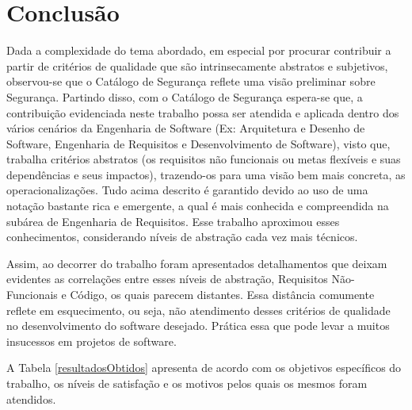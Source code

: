 \chapter{Conclusão}
\label{chap:consideracoesFinais}



Dada a complexidade do tema abordado, em especial por procurar contribuir a partir de critérios de qualidade que são intrinsecamente abstratos e subjetivos, observou-se que o Catálogo de Segurança reflete uma visão preliminar sobre Segurança. Partindo disso, com o Catálogo de Segurança espera-se que, a contribuição evidenciada neste trabalho possa ser atendida e aplicada dentro dos vários cenários da Engenharia de Software (Ex: Arquitetura e Desenho de Software, Engenharia de Requisitos e Desenvolvimento de Software), visto que, trabalha critérios abstratos (os requisitos não funcionais ou metas flexíveis e suas dependências e seus impactos), trazendo-os para uma visão bem mais concreta, as operacionalizações. Tudo acima descrito é garantido devido ao uso de uma notação bastante rica e emergente, a qual é  mais conhecida e compreendida na subárea de Engenharia de Requisitos. Esse trabalho aproximou esses conhecimentos, considerando níveis de abstração cada vez mais técnicos.

Assim, ao decorrer do trabalho foram apresentados detalhamentos que deixam evidentes as correlações entre esses níveis de abstração, Requisitos Não-Funcionais e Código, os quais parecem distantes. Essa distância comumente reflete em esquecimento, ou seja, não atendimento desses critérios de qualidade no desenvolvimento do software desejado. Prática essa que pode levar a muitos insucessos em projetos de software. 


A Tabela \ref{resultadosObtidos} apresenta de acordo com os objetivos específicos do trabalho, os níveis de satisfação e os motivos pelos quais os mesmos foram atendidos. 


